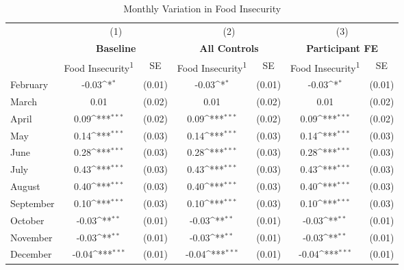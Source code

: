 \begin{table}[htbp]\centering \small
\def\sym#1{\ifmmode^{#1}\else\(^{#1}\)\fi}
\caption{Monthly Variation in Food Insecurity \label{table_month_insecurity}}
\begin{tabular}{l*{3}{cc}}
\toprule
                    &\multicolumn{2}{c}{(1)}           &\multicolumn{2}{c}{(2)}           &\multicolumn{2}{c}{(3)}           \\
                    &\multicolumn{2}{c}{\textbf{Baseline}}&\multicolumn{2}{c}{\textbf{All Controls}}&\multicolumn{2}{c}{\textbf{Participant FE} }\\
                    &Food Insecurity\textsuperscript{1}         &          SE&Food Insecurity\textsuperscript{1}         &          SE&Food Insecurity\textsuperscript{1}         &          SE\\
\midrule
February            &       -0.03\sym{*}  &      (0.01)&       -0.03\sym{*}  &      (0.01)&       -0.03\sym{*}  &      (0.01)\\
March               &        0.01         &      (0.02)&        0.01         &      (0.02)&        0.01         &      (0.02)\\
April               &        0.09\sym{***}&      (0.02)&        0.09\sym{***}&      (0.02)&        0.09\sym{***}&      (0.02)\\
May                 &        0.14\sym{***}&      (0.03)&        0.14\sym{***}&      (0.03)&        0.14\sym{***}&      (0.03)\\
June                &        0.28\sym{***}&      (0.03)&        0.28\sym{***}&      (0.03)&        0.28\sym{***}&      (0.03)\\
July                &        0.43\sym{***}&      (0.03)&        0.43\sym{***}&      (0.03)&        0.43\sym{***}&      (0.03)\\
August              &        0.40\sym{***}&      (0.03)&        0.40\sym{***}&      (0.03)&        0.40\sym{***}&      (0.03)\\
September           &        0.10\sym{***}&      (0.03)&        0.10\sym{***}&      (0.03)&        0.10\sym{***}&      (0.03)\\
October             &       -0.03\sym{**} &      (0.01)&       -0.03\sym{**} &      (0.01)&       -0.03\sym{**} &      (0.01)\\
November            &       -0.03\sym{**} &      (0.01)&       -0.03\sym{**} &      (0.01)&       -0.03\sym{**} &      (0.01)\\
December            &       -0.04\sym{***}&      (0.01)&       -0.04\sym{***}&      (0.01)&       -0.04\sym{***}&      (0.01)\\

\end{tabular}
\end{table}
